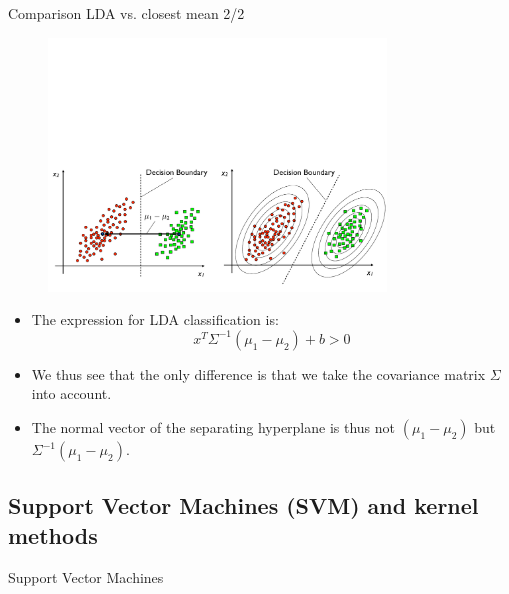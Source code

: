 \documentclass[xcolor=pdftex,dvipsnames,table]{beamer}
\begin{document}
\begin{frame}{Comparison LDA vs. closest mean 2/2}
	\begin{figure}[htb]
		\includegraphics[width=0.8\textwidth]{../graphics/LDA_projection.pdf}
	\end{figure}
	\begin{itemize}
		\item The expression for LDA classification is:
		\begin{equation*}
			x^T\Sigma^{-1}(\mu_1-\mu_2) + b > 0
		\end{equation*}
		\item We thus see that the only difference is that we take the covariance matrix $\Sigma$ into account. 
		\item The normal vector of the separating hyperplane is thus not $(\mu_1-\mu_2)$ but $\Sigma^{-1}(\mu_1-\mu_2)$.
	\end{itemize}
\end{frame}

\subsection{Support Vector Machines (SVM) and kernel methods}
\begin{frame}[plain,c]
\begin{center}
\Huge Support Vector Machines
\end{center}
\end{frame}
\end{document}
